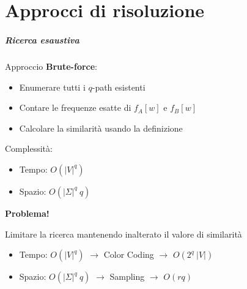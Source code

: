 \part{Approcci di risoluzione}

\begin{frame}
	\partpage
	\centering
\end{frame}

\begin{frame}
	\frametitle{Ricerca esaustiva}
	
	Approccio \textbf{Brute-force}:
	\begin{itemize}
		\item Enumerare tutti i $q$-path esistenti
		\item Contare le frequenze esatte di $f_A[w]$ e $f_B[w]$
		\item Calcolare la similarità usando la definizione
	\end{itemize}

	\pause
	\medskip
	
	Complessità:
	\begin{itemize}
		\item Tempo: $O(|V|^q)$
		\item Spazio: $O(|\Sigma|^q\ q)$
	\end{itemize}

	\pause
	\centering
	\medskip
	\textbf{Problema!}
	
	Limitare la ricerca mantenendo inalterato il valore di similarità
	
	\pause
	
	\begin{itemize}
		\item Tempo: $O(|V|^q)$ $\rightarrow$ Color Coding $\rightarrow$ $O(2^q\ |V|)$
		\item Spazio: $O(|\Sigma|^q\ q)$ $\rightarrow$ Sampling $\rightarrow$ $O(rq)$
	\end{itemize}
	
	
		
\end{frame}

